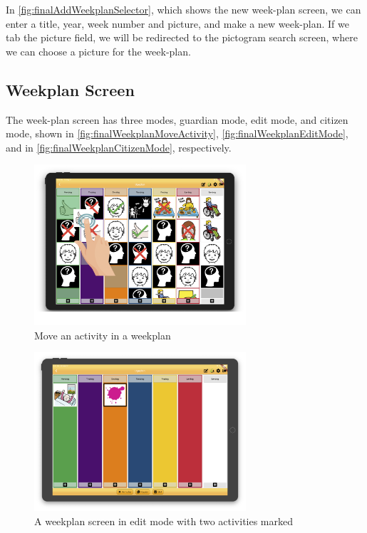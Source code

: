 In \autoref{fig:finalAddWeekplanSelector}, which shows the new week-plan screen, we can enter a title, year, week number and picture, and make a new week-plan. If we tab the picture field, we will be redirected to the pictogram search screen, where we can choose a picture for the week-plan.

\subsection{Weekplan Screen}

The week-plan screen has three modes, \gls{guardian} mode, edit mode, and \gls{citizen} mode, shown in \autoref{fig:finalWeekplanMoveActivity}, \autoref{fig:finalWeekplanEditMode}, and in \autoref{fig:finalWeekplanCitizenMode}, respectively.

\begin{figure}[H]
    \begin{center}
        \includegraphics[width=0.7\textwidth]{figures/FinalScreen/weekplanScreenMoveActivity.png}
    \end{center}
    \caption{Move an activity in a weekplan}
    \label{fig:finalWeekplanMoveActivity}
\end{figure}

\begin{figure}[H]
    \begin{center}
        \includegraphics[width=0.7\textwidth]{figures/FinalScreen/editWeekplanScreenMarked.png}
    \end{center}
    \caption{A weekplan screen in edit mode with two activities marked}
    \label{fig:finalWeekplanEditMode}
\end{figure}

